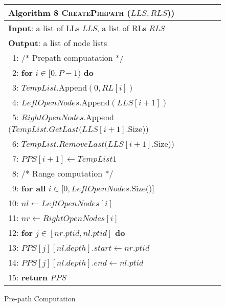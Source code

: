 \begin{figure}[t]
	\centering
	\begin{tabular}{l}
		\hline
		\textbf{Algorithm 8} \textsc{CreatePrepath} ($LLS, RLS$)) \\
		\hline
		\textbf{Input}: a list of LLs \emph{LLS}, a list of RLs \emph{RLS} \\
		\textbf{Output}: a list of node lists  \\
		~1: \hspace{1 mm} /* Prepath compuatation */ \\
		~2: \hspace{1 mm} \textbf{for} $i \in [0, P-1)$ \textbf{do} \\
		~3: \hspace{4 mm} $TempList$.Append$(0, RL[i])$ \\ 
		~4: \hspace{4 mm} $LeftOpenNodes$.Append$(LLS[i+1])$ \\
		~5: \hspace{4 mm} $RightOpenNodes$.Append$(TempList.GetLast(LLS[i+1]$.Size)) \\
		~6: \hspace{4 mm} $TempList.RemoveLast(LLS[i+1]$.Size)) \\
		~7: \hspace{4 mm} $PPS[i+1] \leftarrow TempList1$   \\
		~8: \hspace{1 mm} /* Range computation */ \\
		~9: \hspace{1 mm} \textbf{for all} $i \in [0, LeftOpenNodes.$Size()]\\
		10: \hspace{4 mm} $nl \leftarrow LeftOpenNodes[i] $ \\
		11: \hspace{4 mm} $nr \leftarrow RightOpenNodes[i] $ \\
		12: \hspace{4 mm} \textbf{for } $j \in [nr.ptid, nl.ptid]$ \textbf{do}\\
		13: \hspace{8 mm} $PPS[j][nl.depth].start \leftarrow nr.ptid$  \\
		14: \hspace{8 mm} $PPS[j][nl.depth].end \leftarrow nl.ptid$  \\
		15: \hspace{0 mm} \textbf{return} \emph{PPS} \\
		\hline
	\end{tabular}
	\caption{Pre-path Computation}
	\label{fig:algSimpleQuery}
\end{figure}
